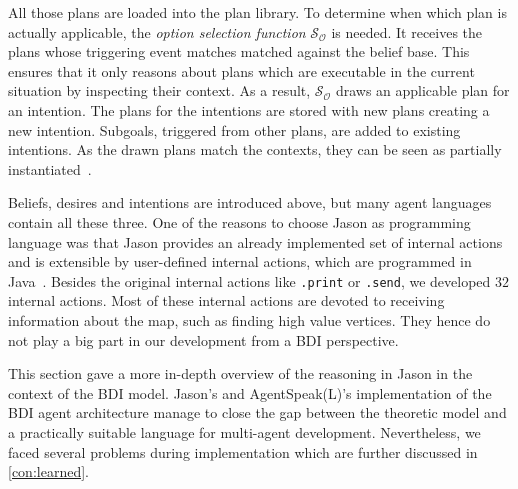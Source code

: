 All those plans are loaded into the plan library.
To determine when which plan is actually applicable, the \emph{option selection function} $\mathcal{S_O}$ is needed.
It receives the plans whose triggering event matches matched against the belief base.
This ensures that it only reasons about plans which are executable in the current situation by inspecting their context.
As a result, $\mathcal{S_O}$ draws an applicable plan for an intention.
The plans for the intentions are stored with new plans creating a new intention.
Subgoals, triggered from other plans, are added to existing intentions.
As the drawn plans match the contexts, they can be seen as partially instantiated~\cite{rafel_Javabased_2007}.

Beliefs, desires and intentions are introduced above, but many agent languages contain all these three.
One of the reasons to choose Jason as programming language was that Jason provides an already implemented set of internal actions and is extensible by user-defined internal actions, which are programmed in Java~\cite{rafael_Javabased_2007}.
Besides the original internal actions like \texttt{.print} or \texttt{.send}, we developed $32$ internal actions.
Most of these internal actions are devoted to receiving information about the map, such as finding high value vertices.
They hence do not play a big part in our development from a BDI perspective.

This section gave a more in-depth overview of the reasoning in Jason in the context of the BDI model.
Jason's and AgentSpeak(L)'s implementation of the BDI agent architecture manage to close the gap between the theoretic model and a practically suitable language for multi-agent development.
Nevertheless, we faced several problems during implementation which are further discussed in \autoref{con:learned}.
